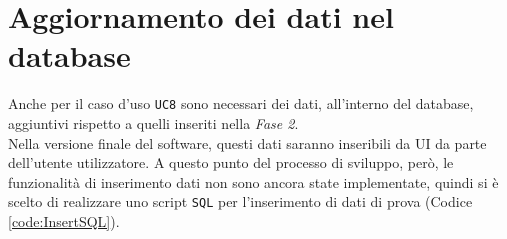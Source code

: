\section{Aggiornamento dei dati nel database}
Anche per il caso d'uso \verb|UC8| sono necessari dei dati, all'interno del database, aggiuntivi rispetto a quelli inseriti nella \textit{Fase 2}.\\
Nella versione finale del software, questi dati saranno inseribili da UI da parte dell'utente utilizzatore. A questo punto del processo di sviluppo, però, le funzionalità di inserimento dati non sono ancora state implementate, quindi si è scelto di realizzare uno script \verb|SQL| per l'inserimento di dati di prova (Codice \ref{code:InsertSQL}). \\


